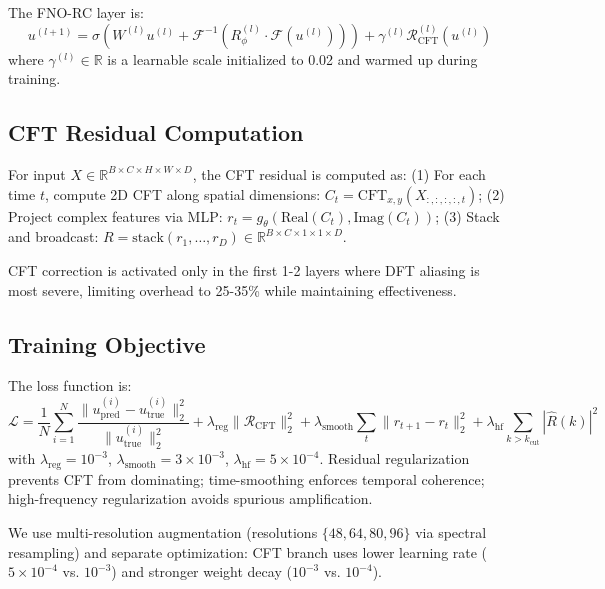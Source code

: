 \documentclass[11pt]{article}
\newcommand{\R}{\mathbb{R}}
\newcommand{\F}{\mathcal{F}}
\begin{document}
The FNO-RC layer is:
\begin{equation}
u^{(l+1)} = \sigma\left( W^{(l)} u^{(l)} + \F^{-1}\left( R_\phi^{(l)} \cdot \F(u^{(l)}) \right) \right) + \gamma^{(l)} \mathcal{R}_{\text{CFT}}^{(l)}(u^{(l)})
\end{equation}
where $\gamma^{(l)} \in \R$ is a learnable scale initialized to 0.02 and warmed up during training.

\subsection{CFT Residual Computation}

For input $X \in \R^{B \times C \times H \times W \times D}$, the CFT residual is computed as: (1) For each time $t$, compute 2D CFT along spatial dimensions: $C_t = \text{CFT}_{x,y}(X_{:,:,:,:,t})$; (2) Project complex features via MLP: $r_t = g_\theta(\text{Real}(C_t), \text{Imag}(C_t))$; (3) Stack and broadcast: $R = \text{stack}(r_1, \ldots, r_D) \in \R^{B \times C \times 1 \times 1 \times D}$.

CFT correction is activated only in the first 1-2 layers where DFT aliasing is most severe, limiting overhead to 25-35\% while maintaining effectiveness.

\subsection{Training Objective}

The loss function is:
\begin{equation}
\mathcal{L} = \frac{1}{N} \sum_{i=1}^{N} \frac{\|u_{\text{pred}}^{(i)} - u_{\text{true}}^{(i)}\|_2^2}{\|u_{\text{true}}^{(i)}\|_2^2} + \lambda_{\text{reg}} \|\mathcal{R}_{\text{CFT}}\|_2^2 + \lambda_{\text{smooth}} \sum_{t} \|r_{t+1} - r_t\|_2^2 + \lambda_{\text{hf}} \sum_{k > k_{\text{cut}}} |\hat{R}(k)|^2
\end{equation}
with $\lambda_{\text{reg}} = 10^{-3}$, $\lambda_{\text{smooth}} = 3 \times 10^{-3}$, $\lambda_{\text{hf}} = 5 \times 10^{-4}$. Residual regularization prevents CFT from dominating; time-smoothing enforces temporal coherence; high-frequency regularization avoids spurious amplification.

We use multi-resolution augmentation (resolutions $\{48, 64, 80, 96\}$ via spectral resampling) and separate optimization: CFT branch uses lower learning rate ($5 \times 10^{-4}$ vs. $10^{-3}$) and stronger weight decay ($10^{-3}$ vs. $10^{-4}$).
\end{document}
